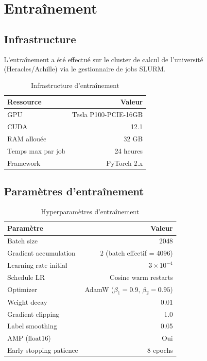 \documentclass[12pt,a4paper]{article}
\begin{document}
\section{Entraînement}

\subsection{Infrastructure}

L'entraînement a été effectué sur le cluster de calcul de l'université (Heracles/Achille) via le gestionnaire de jobs SLURM.

\begin{table}[H]
\centering
\begin{tabular}{lr}
\toprule
\textbf{Ressource} & \textbf{Valeur} \\
\midrule
GPU & Tesla P100-PCIE-16GB \\
CUDA & 12.1 \\
RAM allouée & 32 GB \\
Temps max par job & 24 heures \\
Framework & PyTorch 2.x \\
\bottomrule
\end{tabular}
\caption{Infrastructure d'entraînement}
\end{table}

\subsection{Paramètres d'entraînement}

\begin{table}[H]
\centering
\begin{tabular}{lr}
\toprule
\textbf{Paramètre} & \textbf{Valeur} \\
\midrule
Batch size & 2048 \\
Gradient accumulation & 2 (batch effectif = 4096) \\
Learning rate initial & $3 \times 10^{-4}$ \\
Schedule LR & Cosine warm restarts \\
Optimizer & AdamW ($\beta_1=0.9$, $\beta_2=0.95$) \\
Weight decay & 0.01 \\
Gradient clipping & 1.0 \\
Label smoothing & 0.05 \\
AMP (float16) & Oui \\
Early stopping patience & 8 epochs \\
\bottomrule
\end{tabular}
\caption{Hyperparamètres d'entraînement}
\end{table}
\end{document}
